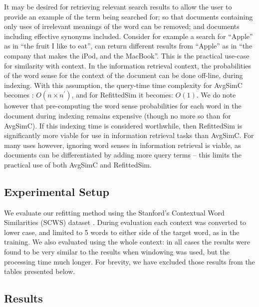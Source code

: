 \documentclass{sig-alternate}
\begin{document}
It may be desired for retrieving relevant search results to allow the user to provide an example of the term being searched for; so that documents containing only uses of irrelevant meanings of the word can be removed; and documents including effective synonyms included. Consider for example a search for \enquote{Apple} as in \enquote{the fruit I like to eat}, can return different results from \enquote{Apple} as in \enquote{the company that makes the iPod, and the MacBook}. This is the practical use-case for similarity with context.
In the information retrieval context, the probabilities of the word sense for the context of the document can be done off-line, during indexing. With this assumption, the query-time time complexity for AvgSimC becomes : $O(n\times n^{\prime})$, and for RefittedSim it becomes: $O(1)$.
We do note however that pre-computing the word sense probabilities for each word in the document during indexing remains expensive (though no more so than for AvgSimC). If this indexing time is considered worthwhile, then RefittedSim is significantly more viable for use in information retrieval tasks than AvgSimC. For many uses however, ignoring word senses in information retrieval is viable, as documents can be differentiated by adding more query terms -- this limits the practical use of both AvgSimC and RefittedSim.

\subsection{Experimental Setup}
We evaluate our refitting method using the Stanford's Contextual Word Similarities (SCWS) dataset \parencite{Huang2012}.
During evaluation each context was converted to lower case, and limited to 5 words to either side of the target word, as in the training.
We also evaluated using the whole context: in all cases the results were found to be very similar to the results when windowing was used, but the processing time much longer.
For brevity, we have excluded those results from the tables presented below.


\subsection{Results}
\end{document}

